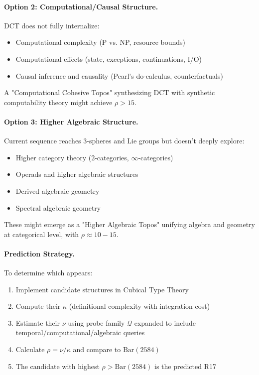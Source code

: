 \documentclass[11pt]{article}
\theoremstyle{definition}
\begin{document}
\paragraph{Option 2: Computational/Causal Structure.}
DCT does not fully internalize:
\begin{itemize}
\item Computational complexity (P vs. NP, resource bounds)
\item Computational effects (state, exceptions, continuations, I/O)
\item Causal inference and causality (Pearl's do-calculus, counterfactuals)
\end{itemize}

A "Computational Cohesive Topos" synthesizing DCT with synthetic computability theory might achieve $\rho > 15$.

\paragraph{Option 3: Higher Algebraic Structure.}
Current sequence reaches 3-spheres and Lie groups but doesn't deeply explore:
\begin{itemize}
\item Higher category theory (2-categories, $\infty$-categories)
\item Operads and higher algebraic structures
\item Derived algebraic geometry
\item Spectral algebraic geometry
\end{itemize}

These might emerge as a "Higher Algebraic Topos" unifying algebra and geometry at categorical level, with $\rho \approx 10-15$.

\paragraph{Prediction Strategy.}
To determine which appears:
\begin{enumerate}
\item Implement candidate structures in Cubical Type Theory
\item Compute their $\kappa$ (definitional complexity with integration cost)
\item Estimate their $\nu$ using probe family $\mathcal{Q}$ expanded to include temporal/computational/algebraic queries
\item Calculate $\rho = \nu/\kappa$ and compare to $\text{Bar}(2584)$
\item The candidate with highest $\rho > \text{Bar}(2584)$ is the predicted R17
\end{enumerate}
\end{document}
